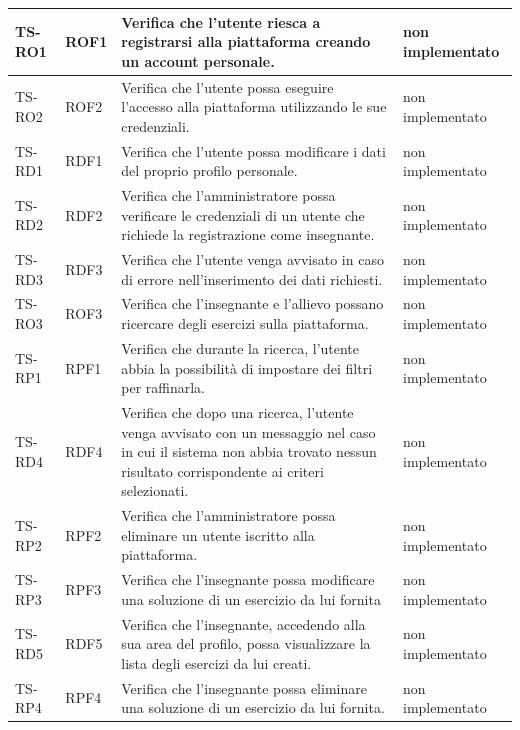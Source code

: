 {\begin{longtable}{|>{\centering\arraybackslash}m{1.6cm}|>{\centering\arraybackslash}m{1.7cm}|m{6.41cm}|>{\centering\arraybackslash}m{3.1cm}|}
		\hline
		\rowcolor{LightGray}
		TS-RO1
		& ROF1 
		& Verifica che l'utente riesca a registrarsi alla piattaforma creando un account personale. 
		& non implementato\\ \hline
		\rowcolor{white}
		TS-RO2
		& ROF2 
		& Verifica che l'utente possa eseguire l'accesso alla piattaforma utilizzando le sue credenziali.
		& non implementato\\ \hline
		\rowcolor{LightGray}
		TS-RD1
		& RDF1 
		& Verifica che l'utente possa modificare i dati del proprio profilo personale.
		& non implementato\\ \hline
		\rowcolor{white}
		TS-RD2
		& RDF2 
		& Verifica che l'amministratore possa verificare le credenziali di un utente che richiede la registrazione come insegnante. 
		& non implementato\\ \hline
		\rowcolor{LightGray}
		TS-RD3
		& RDF3 
		& Verifica che l'utente venga avvisato in caso di errore nell'inserimento dei dati richiesti.
		& non implementato\\ \hline
		\rowcolor{white}
		TS-RO3		
		& ROF3 
		& Verifica che l'insegnante e l'allievo possano ricercare degli esercizi sulla piattaforma.
		& non implementato\\ \hline
		\rowcolor{LightGray}
		TS-RP1		
		& RPF1 
		& Verifica che durante la ricerca, l'utente abbia la possibilità di impostare dei filtri per raffinarla. 		
		& non implementato\\ \hline
		\rowcolor{white}
		TS-RD4		
		& RDF4 
		& Verifica che dopo una ricerca, l'utente venga avvisato con un messaggio nel caso in cui il sistema non abbia trovato nessun risultato corrispondente ai criteri selezionati.
		& non implementato\\ \hline
		\rowcolor{LightGray}
		TS-RP2		
		& RPF2 
		& Verifica che l'amministratore possa eliminare un utente iscritto alla piattaforma.
		& non implementato\\ \hline
		\rowcolor{white}
		TS-RP3		
		& RPF3 
		& Verifica che l'insegnante possa modificare una soluzione di un esercizio da lui fornita
		& non implementato\\ \hline
		\rowcolor{LightGray}
		TS-RD5		
		& RDF5 
		& Verifica che l'insegnante, accedendo alla sua area del profilo, possa visualizzare la lista degli esercizi da lui creati. 
		& non implementato\\ \hline
		\rowcolor{white}
		TS-RP4		
		& RPF4 
		& Verifica che l'insegnante possa eliminare una soluzione di un esercizio da lui fornita. 
		& non implementato\\ \hline

\end{longtable}}
